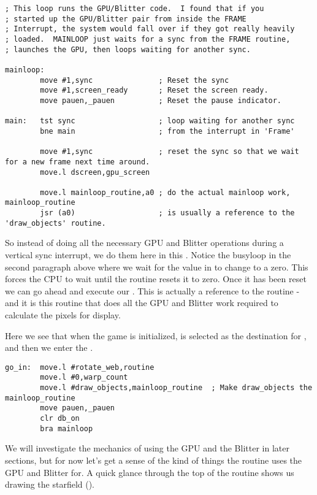 \begin{lstlisting}[escapechar=\%]
; This loop runs the GPU/Blitter code.  I found that if you
; started up the GPU/Blitter pair from inside the FRAME
; Interrupt, the system would fall over if they got really heavily
; loaded.  MAINLOOP just waits for a sync from the FRAME routine,
; launches the GPU, then loops waiting for another sync.

mainloop:
        move #1,sync               ; Reset the sync
        move #1,screen_ready       ; Reset the screen ready.
        move pauen,_pauen          ; Reset the pause indicator.

main:   tst sync                   ; loop waiting for another sync
        bne main                   ; from the interrupt in 'Frame'

        move #1,sync               ; reset the sync so that we wait for a new frame next time around.
        move.l dscreen,gpu_screen

        move.l mainloop_routine,a0 ; do the actual mainloop work, mainloop_routine
        jsr (a0)                   ; is usually a reference to the 'draw_objects' routine.
\end{lstlisting}

So instead of doing all the necessary GPU and Blitter operations during a vertical sync interrupt, we do them
here in this . Notice the busyloop in the second paragraph above where we wait for the value in 
to change to a zero. This forces the CPU to wait until the  routine resets it to zero. Once it has
been reset we can go ahead and execute our . This is actually a reference to the 
 routine - and it is this routine that does all the GPU and Blitter work required to calculate
the pixels for display.

Here we see that when the game is initialized,  is selected as the destination for
, and then we enter the .
\begin{lstlisting}
go_in:  move.l #rotate_web,routine
        move.l #0,warp_count
        move.l #draw_objects,mainloop_routine  ; Make draw_objects the mainloop_routine
        move pauen,_pauen
        clr db_on
        bra mainloop
\end{lstlisting}

We will investigate the mechanics of using the GPU and the Blitter in later sections, but for now let's get a
sense of the kind of things the  routine uses the GPU and Blitter for.
A quick glance through the top of the routine shows us drawing the starfield ().

